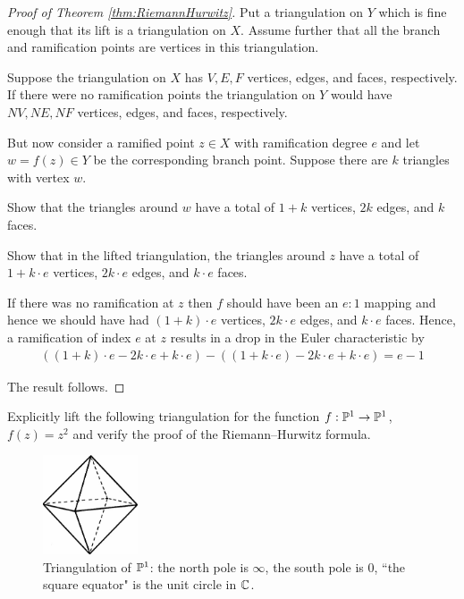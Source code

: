 \documentclass{article}
\begin{document}
  \begin{proof}[Proof of Theorem \ref{thm:RiemannHurwitz}]
    Put a triangulation on $Y$ which is fine enough that its lift is a triangulation on $X$.
    Assume further that all the branch and ramification points are vertices in this triangulation.

    Suppose the triangulation on $X$ has $V, E, F$ vertices, edges, and faces, respectively.
    If there were no ramification points the triangulation on $Y$ would have $NV, NE, NF$ vertices, edges, and faces, respectively.

    But now consider a ramified point $z \in X$ with ramification degree $e$ and let $w = f(z) \in Y$ be the corresponding branch point. Suppose there are $k$ triangles with vertex $w$.
    \begin{qbox}
      Show that the triangles around $w$ have a total of $1 + k$ vertices, $2k$ edges, and $k$ faces.
    \end{qbox}
    \begin{qbox}
      Show that in the lifted triangulation, the triangles around $z$ have a total of $1 + k \cdot e$ vertices, $ 2k \cdot e$ edges, and $k \cdot e$ faces.
    \end{qbox}

    If there was no ramification at $z$ then $f$ should have been an $e:1$ mapping and hence we should have had $(1 + k)\cdot e$ vertices, $2k\cdot e$ edges, and $k\cdot e$ faces.
    Hence, a ramification of index $e$ at $z$ results in a drop in the Euler characteristic by
    \begin{align*}
      ((1 + k)\cdot e - 2k\cdot e + k\cdot e) - ((1 + k \cdot e) - 2k \cdot e + k\cdot e) = e - 1
    \end{align*}

    The result follows.
  \end{proof}

\begin{qbox}
  Explicitly lift the following triangulation for the function $f:\mathbb{P}^1 \rightarrow \mathbb{P}^1$, $f(z) = z^2$ and verify the proof of the Riemann--Hurwitz formula.
  \begin{figure}[H]
  \centering
    \includegraphics[width=0.25\textwidth]{images/octahedron.jpg}
    \caption{Triangulation of $\mathbb{P}^1$: the north pole is $\infty$, the south pole is $0$, ``the square equator" is the unit circle in $\mathbb{C}$.}
  \end{figure}

\end{qbox}
\end{document}
